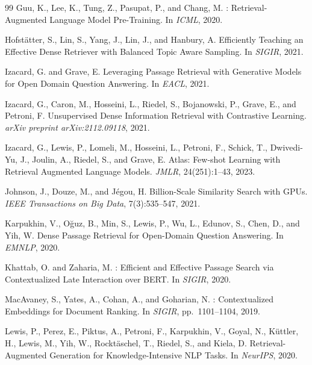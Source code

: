 \documentclass[11pt]{article}
\begin{document}
\begin{thebibliography}{99}
Guu, K., Lee, K., Tung, Z., Pasupat, P., and Chang, M.
: Retrieval-Augmented Language Model Pre-Training.
\newblock In \emph{ICML}, 2020.

Hofst{\"a}tter, S., Lin, S., Yang, J., Lin, J., and Hanbury, A.
\newblock Efficiently Teaching an Effective Dense Retriever with Balanced Topic Aware
  Sampling.
\newblock In \emph{SIGIR}, 2021.

Izacard, G. and Grave, E.
\newblock Leveraging Passage Retrieval with Generative Models for Open Domain Question
  Answering.
\newblock In \emph{EACL}, 2021.

Izacard, G., Caron, M., Hosseini, L., Riedel, S., Bojanowski, P., Grave, E., and
  Petroni, F.
\newblock Unsupervised Dense Information Retrieval with Contrastive Learning.
\newblock \emph{arXiv preprint arXiv:2112.09118}, 2021.

Izacard, G., Lewis, P., Lomeli, M., Hosseini, L., Petroni, F., Schick, T., Dwivedi-Yu,
  J., Joulin, A., Riedel, S., and Grave, E.
\newblock Atlas: Few-shot Learning with Retrieval Augmented Language Models.
\newblock \emph{JMLR}, 24(251):1--43, 2023.

Johnson, J., Douze, M., and J{\'e}gou, H.
\newblock Billion-Scale Similarity Search with {GPUs}.
\newblock \emph{IEEE Transactions on Big Data}, 7(3):535--547, 2021.

Karpukhin, V., O{\u{g}}uz, B., Min, S., Lewis, P., Wu, L., Edunov, S., Chen, D., and
  Yih, W.
\newblock Dense Passage Retrieval for Open-Domain Question Answering.
\newblock In \emph{EMNLP}, 2020.

Khattab, O. and Zaharia, M.
: Efficient and Effective Passage Search via Contextualized Late
  Interaction over {BERT}.
\newblock In \emph{SIGIR}, 2020.

MacAvaney, S., Yates, A., Cohan, A., and Goharian, N.
: Contextualized Embeddings for Document Ranking.
\newblock In \emph{SIGIR}, pp.\ 1101--1104, 2019.

Lewis, P., Perez, E., Piktus, A., Petroni, F., Karpukhin, V., Goyal, N., K{\"u}ttler,
  H., Lewis, M., Yih, W., Rockt{\"a}schel, T., Riedel, S., and Kiela, D.
\newblock Retrieval-Augmented Generation for Knowledge-Intensive {NLP} Tasks.
\newblock In \emph{NeurIPS}, 2020.


\end{thebibliography}
\end{document}
